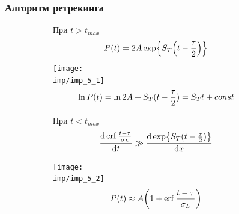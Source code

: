 \documentclass[10pt,pdf,hyperref={unicode}, dvipsnames]{beamer}
\begin{document}
    

\begin{frame}
\frametitle{Алгоритм ретрекинга}
\vskip -3pt
\def\imp{fig/retracking}
\begin{figure}
    \centering
    \begin{subfigure}{0.49\linewidth}
    При $t > t_{max}$ 
    \begin{equation}
        P(t) = 2A\exp{S_T\qty(t - \frac{\tau}{2})}
    \end{equation}
        \centering
        \texttt{[image: \\imp/imp\_5\_1]}
        \begin{equation}
            \footnotesize
            \ln P(t) = \ln 2A + S_T(t - \frac{\tau}{2}) = S_T t + const
        \end{equation}
    \end{subfigure}
    \hfill
    \begin{subfigure}{0.49\linewidth}
        При $t < t_{max}$ 
        \begin{equation}
            \dv{\erf\frac{t - \tau}{\sigma_L}}{t} \gg 
            \dv{\exp{S_T(t - \frac{\tau}{2})}}{x}
        \end{equation}

        \centering
        \texttt{[image: \\imp/imp\_5\_2]}
        \begin{equation}
            \footnotesize
            P(t) \approx A\qty(1 + \erf\frac{t - \tau}{\sigma_L})
        \end{equation}
    \end{subfigure}

\end{figure}
\end{frame}
\end{document}
